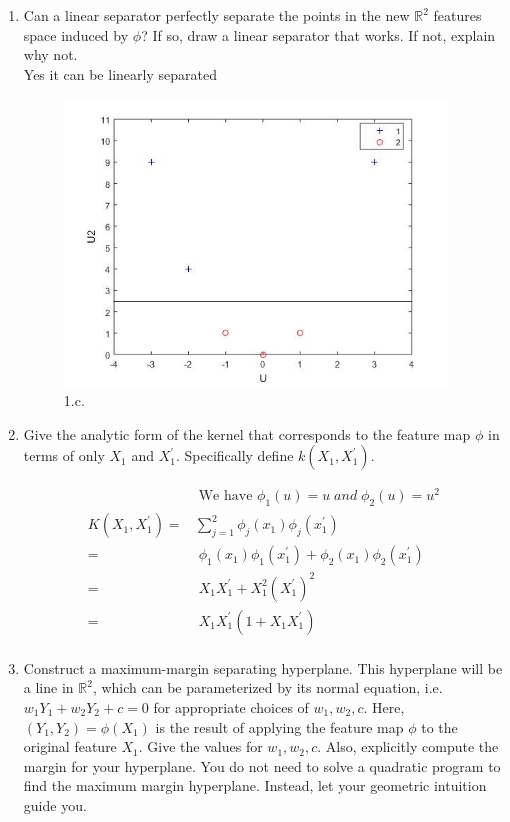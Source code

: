 \begin{enumerate}
\begin{enumerate}
  \item {} Can a linear separator perfectly separate the
    points in the new $\mathbb{R}^2$ features space induced by $\phi$?
    If so, draw a linear separator that works.  If not, explain why
    not. \\
	Yes it can be linearly separated \\

\begin{figure}[h]
    \begin{center}
      \includegraphics[width=4in]{images/1_2.jpg}
    \end{center}
    \caption{ 1.c.}
    \label{fig:1.c}
  \end{figure}
   
  \item {} Give the analytic form of the kernel that
    corresponds to the feature map $\phi$ in terms of only $X_1$ and
    $X_1^{\prime}$.  Specifically define $k(X_1,X_1^{\prime})$. 

\begin{align*}
	&\; \text{We have } \phi_1(u) = u \; and \; \phi_2(u) = u^2 \\
	 K(X_1,X_1^{\prime}) =& \sum\limits_{j=1}^2 \phi_j(x_1) \phi_j(x_1^{\prime})\\
	 =&\; \phi_1(x_1) \phi_1(x_1^{\prime}) + \phi_2(x_1) \phi_2(x_1^{\prime}) \\
	=&\; X_1 X_1^{\prime} + X_1^2 (X_1^{\prime})^2  \\
	=&\; X_1 X_1^{\prime} (1 + X_1 X_1^{\prime} ) \\
\end{align*}
  
  \item {} Construct a maximum-margin separating hyperplane.
    This hyperplane will be a line in $\mathbb{R}^2$, which can be
    parameterized by its normal equation, i.e. $w_1 Y_1 + w_2 Y_2 + c
    = 0$ for appropriate choices of $w_1,w_2,c$.  Here, $(Y_1,Y_2) =
    \phi(X_1)$ is the result of applying the feature map $\phi$ to the
    original feature $X_1$. Give the values for $w_1, w_2, c$.  Also,
    explicitly compute the margin for your hyperplane.  You do not
    need to solve a quadratic program to find the maximum margin
    hyperplane.  Instead, let your geometric intuition guide you.


\end{enumerate}
\end{enumerate}
